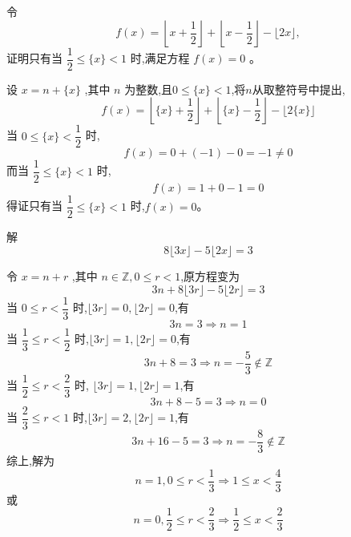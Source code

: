 \begin{questions}
    \question 令 
    \[
    f(x) = \left\lfloor x + \frac{1}{2} \right\rfloor + \left\lfloor x - \frac{1}{2} \right\rfloor - \lfloor 2x \rfloor,
    \]
    证明只有当 $\dfrac{1}{2} \le \{x\} < 1$ 时,满足方程 $f(x) = 0$ 。
    \begin{solution}
        设 $x = n + \{x\}$ ,其中 $n$ 为整数,且$0 \le \{x\} < 1$,将$n$从取整符号中提出,
        \[ 
        f(x) = \left\lfloor \{x\} + \frac{1}{2} \right\rfloor + \left\lfloor \{x\} - \frac{1}{2} \right\rfloor - \lfloor 2\{x\} \rfloor 
        \]
        当 $0 \le \{x\} < \dfrac{1}{2}$ 时,
        \[ 
        f(x) = 0 + (-1) - 0 = -1 \neq 0
        \]
        而当 $\dfrac{1}{2} \le \{x\} < 1$ 时,
        \[
        f(x) = 1 + 0 - 1 = 0
        \]
        得证只有当 $\dfrac{1}{2} \le \{x\} < 1$ 时,$f(x) = 0$。
    \end{solution}

    \question 解 
    \[
    8\lfloor 3x \rfloor - 5\lfloor 2x \rfloor = 3
    \]
    \begin{solution}
        令 $x = n + r$ ,其中 $n \in \mathbb{Z}, 0 \le r < 1$,原方程变为 
        \[ 
        3n + 8\lfloor 3r \rfloor - 5\lfloor 2r \rfloor = 3 
        \]
        当 $0 \le r < \dfrac{1}{3}$ 时,$\lfloor 3r \rfloor = 0, \lfloor 2r \rfloor = 0$,有
        \[
        3n = 3 \Rightarrow n = 1
        \]
        当 $\dfrac{1}{3} \le r < \dfrac{1}{2}$ 时,$\lfloor 3r \rfloor = 1, \lfloor 2r \rfloor = 0$,有
        \[
        3n + 8 = 3 \Rightarrow n = -\frac{5}{3} \notin \mathbb{Z}
        \]
        当 $\dfrac{1}{2} \le r < \dfrac{2}{3}$ 时, $\lfloor 3r \rfloor = 1, \lfloor 2r \rfloor = 1$,有
        \[
        3n + 8 - 5 = 3 \Rightarrow n = 0
        \]
        当 $\dfrac{2}{3} \le r < 1$ 时,$\lfloor 3r \rfloor = 2, \lfloor 2r \rfloor = 1$,有
        \[
        3n + 16 - 5 = 3 \Rightarrow n = -\frac{8}{3} \notin \mathbb{Z}
        \]
        综上,解为
        \[
        n = 1, 0 \le r < \frac{1}{3} \Rightarrow 1 \le x < \frac{4}{3}
        \]
        或
        \[
        n = 0, \frac{1}{2} \le r < \frac{2}{3} \Rightarrow \frac{1}{2} \le x < \frac{2}{3}
        \]
    \end{solution}


\end{questions}
